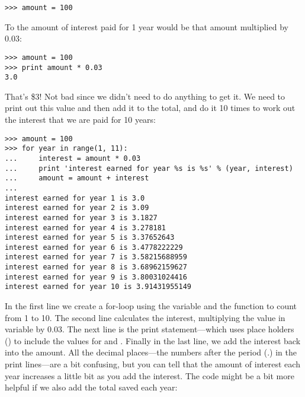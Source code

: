 \begin{listing}
\begin{verbatim}
>>> amount = 100
\end{verbatim}
\end{listing}

To the amount of interest paid for 1 year would be that amount multiplied by 0.03:

\begin{listing}
\begin{verbatim}
>>> amount = 100
>>> print amount * 0.03
3.0
\end{verbatim}
\end{listing}

That's \$3!  Not bad since we didn't need to do anything to get it.  We need to print out this value and then add it to the total, and do it 10 times to work out the interest that we are paid for 10 years:

\begin{listing}
\begin{verbatim}
>>> amount = 100
>>> for year in range(1, 11):
...     interest = amount * 0.03
...     print 'interest earned for year %s is %s' % (year, interest)
...     amount = amount + interest
... 
interest earned for year 1 is 3.0
interest earned for year 2 is 3.09
interest earned for year 3 is 3.1827
interest earned for year 4 is 3.278181
interest earned for year 5 is 3.37652643
interest earned for year 6 is 3.4778222229
interest earned for year 7 is 3.58215688959
interest earned for year 8 is 3.68962159627
interest earned for year 9 is 3.80031024416
interest earned for year 10 is 3.91431955149
\end{verbatim}
\end{listing}

In the first line we create a for-loop using the variable  and the function  to count from 1 to 10.  The second line calculates the interest, multiplying the value in variable  by 0.03.  The next line is the print statement---which uses place holders () to include the values for  and .  Finally in the last line, we add the interest back into the amount.
All the decimal places---the numbers after the period (.) in the print lines---are a bit confusing, but you can tell that the amount of interest each year increases a little bit as you add the interest.
The code might be a bit more helpful if we also add the total saved each year:

